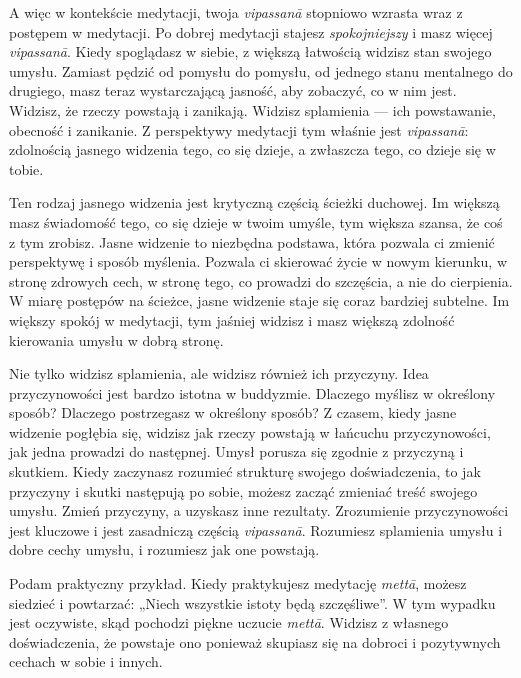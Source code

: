\documentclass[12pt,openany]{book}
\begin{document}
A więc w kontekście medytacji, twoja \textit{vipassanā} stopniowo \linebreak wzrasta wraz z postępem w medytacji. Po dobrej medytacji stajesz \textit{spokojniejszy} i masz więcej \textit{vipassanā}. Kiedy spoglądasz w siebie, z większą łatwością widzisz stan swojego umysłu. Zamiast pędzić od pomysłu do pomysłu, od jednego stanu mentalnego do drugiego, masz teraz wystarczającą jasność, aby zobaczyć, co w nim jest. Widzisz, że rzeczy powstają i zanikają. Widzisz splamienia --- ich powstawanie, obecność i zanikanie. Z perspektywy medytacji tym właśnie jest \textit{vipassanā}: zdolnością jasnego widzenia tego, co się dzieje, a zwłaszcza tego, co dzieje się w tobie.

Ten rodzaj jasnego widzenia jest krytyczną częścią ścieżki duchowej. Im większą masz świadomość tego, co się dzieje w twoim umyśle, tym większa szansa, że coś z tym zrobisz. Jasne widzenie to niezbędna podstawa, która pozwala ci zmienić perspektywę i sposób myślenia. Pozwala ci skierować życie w nowym kierunku, w stronę zdrowych cech, w stronę tego, co prowadzi do szczęścia, a nie do cierpienia. W miarę postępów na ścieżce, jasne widzenie staje się coraz bardziej subtelne. Im większy spokój w medytacji, tym jaśniej widzisz i masz większą zdolność kierowania umysłu w dobrą stronę.

Nie tylko widzisz splamienia, ale widzisz również ich przyczyny. Idea przyczynowości jest bardzo istotna w buddyzmie. \linebreak Dlaczego myślisz w określony sposób? Dlaczego postrzegasz w określony sposób? Z czasem, kiedy jasne widzenie pogłębia się, widzisz jak rzeczy powstają w łańcuchu przyczynowości, jak \linebreak jedna prowadzi do następnej. Umysł porusza się zgodnie z przyczyną i skutkiem. Kiedy zaczynasz rozumieć strukturę swojego doświadczenia, to jak przyczyny i skutki następują po sobie, możesz zacząć zmieniać treść swojego umysłu. Zmień przyczyny, a uzyskasz inne rezultaty. Zrozumienie przyczynowości jest klu\-czo\-we i jest zasadniczą częścią \textit{vipassanā}. Rozumiesz splamienia umysłu i dobre cechy umysłu, i rozumiesz jak one powstają.

Podam praktyczny przykład. Kiedy praktykujesz medytację \textit{mettā}, możesz siedzieć i powtarzać: „Niech wszystkie istoty będą szczęśliwe”. W tym wypadku jest oczywiste, skąd pochodzi piękne uczucie \textit{mettā}. Widzisz z własnego doświadczenia, że powstaje ono ponieważ skupiasz się na dobroci i pozytywnych cechach w sobie i innych.
\end{document}
